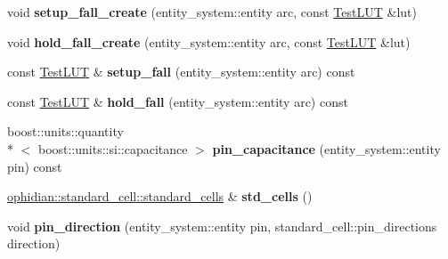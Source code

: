 \begin{DoxyCompactItemize}
\item 
\hypertarget{classophidian_1_1timing_1_1library_afe000257598343b75c93e27caf56c84a}{void {\bfseries setup\-\_\-fall\-\_\-create} (entity\-\_\-system\-::entity arc, const \hyperlink{classophidian_1_1timing_1_1lookup__table}{Test\-L\-U\-T} \&lut)}\label{classophidian_1_1timing_1_1library_afe000257598343b75c93e27caf56c84a}

\item 
\hypertarget{classophidian_1_1timing_1_1library_a0faff8d28e61690a18c3044bb87a5e66}{void {\bfseries hold\-\_\-fall\-\_\-create} (entity\-\_\-system\-::entity arc, const \hyperlink{classophidian_1_1timing_1_1lookup__table}{Test\-L\-U\-T} \&lut)}\label{classophidian_1_1timing_1_1library_a0faff8d28e61690a18c3044bb87a5e66}

\item 
\hypertarget{classophidian_1_1timing_1_1library_a1cee51f84e5bd78e93c05a443391f091}{const \hyperlink{classophidian_1_1timing_1_1lookup__table}{Test\-L\-U\-T} \& {\bfseries setup\-\_\-fall} (entity\-\_\-system\-::entity arc) const }\label{classophidian_1_1timing_1_1library_a1cee51f84e5bd78e93c05a443391f091}

\item 
\hypertarget{classophidian_1_1timing_1_1library_a6f409877cfbd41befee633d2c5229b01}{const \hyperlink{classophidian_1_1timing_1_1lookup__table}{Test\-L\-U\-T} \& {\bfseries hold\-\_\-fall} (entity\-\_\-system\-::entity arc) const }\label{classophidian_1_1timing_1_1library_a6f409877cfbd41befee633d2c5229b01}

\item 
\hypertarget{classophidian_1_1timing_1_1library_a57853b5d7cae1fba20916b78f8b2c031}{boost\-::units\-::quantity\\*
$<$ boost\-::units\-::si\-::capacitance $>$ {\bfseries pin\-\_\-capacitance} (entity\-\_\-system\-::entity pin) const }\label{classophidian_1_1timing_1_1library_a57853b5d7cae1fba20916b78f8b2c031}

\item 
\hypertarget{classophidian_1_1timing_1_1library_ad7f737ee38aaf8310ea436c167d52ca9}{\hyperlink{classophidian_1_1standard__cell_1_1standard__cells}{ophidian\-::standard\-\_\-cell\-::standard\-\_\-cells} \& {\bfseries std\-\_\-cells} ()}\label{classophidian_1_1timing_1_1library_ad7f737ee38aaf8310ea436c167d52ca9}

\item 
\hypertarget{classophidian_1_1timing_1_1library_abb75637e40bc60a849421d621f9d6f26}{void {\bfseries pin\-\_\-direction} (entity\-\_\-system\-::entity pin, standard\-\_\-cell\-::pin\-\_\-directions direction)}\label{classophidian_1_1timing_1_1library_abb75637e40bc60a849421d621f9d6f26}


\end{DoxyCompactItemize}

